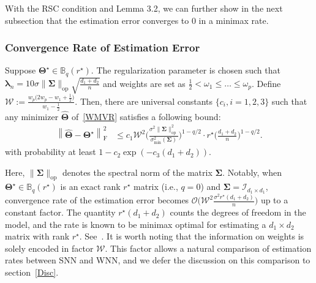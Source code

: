 \documentclass[alpha-refs]{wiley-article}
\begin{document}
With the RSC condition and Lemma 3.2, we can further show in the next subsection that the estimation error converges to $0$ in a minimax rate.

\subsubsection{Convergence Rate of Estimation Error}
\begin{theorem} \label{thm2}
Suppose $\boldsymbol{\Theta^{\star}}\in\mathbb{B}_{q}(r^{\star})$.
The regularization parameter is chosen such that $\boldsymbol{\lambda}_{n}=10\sigma\|\boldsymbol{\Sigma}\|_{\text{op}} \sqrt{\frac{d_{1}+d_{2}}{n}}$ and weights are set
as $\frac{1}{2} < \omega_{1} \leq \dots \leq \omega_{p}$.
Define $\mathcal{W}:=\frac{w_{p}\big(2w_{p}-w_{1}+\frac{1}{2}\big)}{w_{1}-\frac{1}{2}}$.
Then, there are universal constants $\{c_{i},i=1,2,3\}$ such that any minimizer $\boldsymbol{\widehat{\Theta}}$ of~\eqref{WMVR} satisfies a following bound:
\begin{align} \label{Rate}
    \left\| \widehat{\boldsymbol{\Theta}} - \boldsymbol{\Theta^{\star}} \right\|_{\text{F}}^{2}
    &\leq c_{1} \mathcal{W}^{2} \Bigg( \frac{\sigma^{2}\|\boldsymbol{\Sigma}\|_{\text{op}}^{2}}{\sigma_{\text{min}}^{2}(\boldsymbol{\Sigma})} \Bigg)^{1-q/2}
    \cdot r^{\star} \Bigg( \frac{d_{1}+d_{2}}{n} \Bigg)^{1-q/2}.
\end{align}
with probability at least $1-c_{2}\exp(-c_{3}(d_{1}+d_{2}))$.
\end{theorem}

Here, $\|\boldsymbol{\Sigma}\|_{\text{op}}$ denotes the spectral norm of the matrix $\boldsymbol{\Sigma}$.
Notably, when $\boldsymbol{\Theta^{\star}}\in\mathbb{B}_{q}(r^{\star})$ is an exact rank $r^{\star}$ matrix (i.e., $q=0$) and $\boldsymbol{\Sigma} = \mathcal{I}_{d_{1} \times d_{1}}$,
convergence rate of the estimation error becomes $\mathcal{O}\big( \mathcal{W}^{2} \frac{ \sigma^{2} r^{\star} (d_{1}+d_{2}) }{n} \big)$ up to a constant factor.
The quantity $r^{\star} (d_{1}+d_{2})$ counts the degrees of freedom in the model, and the rate is known to be minimax optimal for estimating a $d_{1} \times d_{2}$ matrix with rank $r^{\star}$.
See~\citet{negahban2011estimation,koltchinskii2011nuclear,rohde2011estimation}.
It is worth noting that the information on weights is solely encoded in factor $\mathcal{W}$.
This factor allows a natural comparison of estimation rates between SNN and WNN, and we defer the discussion on this comparison to section~\ref{Disc}.
\end{document}
